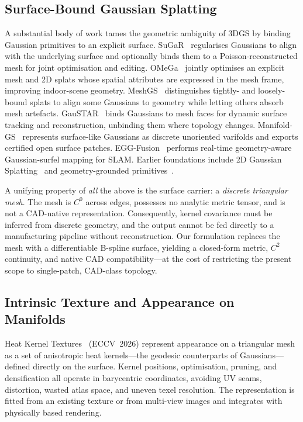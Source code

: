 \subsection{Surface-Bound Gaussian Splatting}\label{sec:rw:bindinggs}

A substantial body of work tames the geometric ambiguity of 3DGS by binding
Gaussian primitives to an explicit surface. SuGaR~\cite{sugar} regularises
Gaussians to align with the underlying surface and optionally binds them to a
Poisson-reconstructed mesh for joint optimisation and editing.
OMeGa~\cite{omega} jointly optimises an explicit mesh and 2D splats whose
spatial attributes are expressed in the mesh frame, improving indoor-scene
geometry. MeshGS~\cite{meshgs} distinguishes tightly- and loosely-bound
splats to align some Gaussians to geometry while letting others absorb mesh
artefacts. GauSTAR~\cite{gaustar} binds Gaussians to mesh faces for dynamic
surface tracking and reconstruction, unbinding them where topology changes.
Manifold-GS~\cite{manifoldgs} represents surface-like Gaussians as discrete
unoriented varifolds and exports certified open surface patches.
EGG-Fusion~\cite{eggfusion} performs real-time geometry-aware Gaussian-surfel
mapping for SLAM. Earlier foundations include 2D Gaussian
Splatting~\cite{2dgaussians} and geometry-grounded
primitives~\cite{geosplatting}.

A unifying property of \emph{all} the above is the surface carrier: a
\emph{discrete triangular mesh}. The mesh is $C^0$ across edges, possesses no
analytic metric tensor, and is not a CAD-native representation. Consequently,
kernel covariance must be inferred from discrete geometry, and the output
cannot be fed directly to a manufacturing pipeline without reconstruction.
Our formulation replaces the mesh with a differentiable B-spline surface,
yielding a closed-form metric, $C^2$ continuity, and native CAD
compatibility---at the cost of restricting the present scope to
single-patch, CAD-class topology.

\subsection{Intrinsic Texture and Appearance on Manifolds}\label{sec:rw:hktex}

Heat Kernel Textures~\cite{hktex} (ECCV~2026) represent appearance on a
triangular mesh as a set of anisotropic heat kernels---the geodesic
counterparts of Gaussians---defined directly on the surface. Kernel
positions, optimisation, pruning, and densification all operate in
barycentric coordinates, avoiding UV seams, distortion, wasted atlas space,
and uneven texel resolution. The representation is fitted from an existing
texture or from multi-view images and integrates with physically based
rendering.


